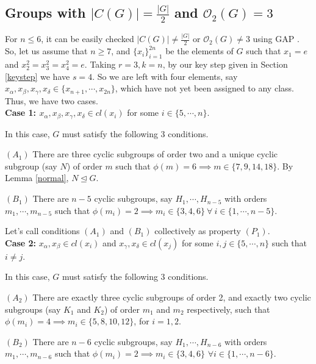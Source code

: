 \documentclass[a4paper,11pt]{amsart}
\numberwithin{equation}{section}
\numberwithin{equation}{subsection}
\begin{document}
\subsection{Groups with \texorpdfstring{$|C(G)|=\frac{|G|}{2}$}{|C(G)|=|G|/2} and \texorpdfstring{$\mathcal{O}_2(G)=3$}{O2(G)=3}} \label{o2(G)=3, |G|/2} 
For $n \leq 6$, it can be easily checked $|C(G)| \neq \frac{|G|}{2}$ or $\mathcal{O}_{2}(G)\neq 3$ using GAP \cite{GAP}. So, let us assume that $n\geq 7$, and $\{x_i\}_{i=1}^{2n}$ be the elements of $G$ such that $x_1 = e$ and $x_2^2=x_{3}^2=x_{4}^2 = e$. 
Taking $r=3, k=n$, by our key step given in Section \ref{keystep} we have $s=4$. So we are left with four elements, say $x_\alpha , x_\beta,x_{\gamma},x_{\delta} \in \{x_{n+1}, \cdots, x_{2n}\}$, which have not yet been assigned to any class. Thus, we have two cases.\\  

 \textbf{Case 1: $x_{\alpha},x_{\beta},x_{\gamma},x_{\delta} \in cl(x_{i})$} for some $i\in\{5,\cdots,n\}$.


 In this case, $G$ must satisfy the following $3$ conditions.

$(A_1)$ There are three cyclic subgroups of order two and a unique cyclic subgroup (say $N$) of order $m$ such that $\phi(m) = 6 \implies m\in \{7,9,14,18\}$. By Lemma \ref{normal}, $N\trianglelefteq G$.

$(B_1)$ There are $n-5$ cyclic subgroups, say $H_1,\cdots,H_{n-5}$ with orders $m_1,\cdots,m_{n-5}$ such that $\phi(m_i) = 2\implies m_i\in \{3,4,6\} ~\forall ~i\in \{1,\cdots,n-5\}$.

 Let's call conditions $(A_1)$ and $(B_1)$ collectively as property $(P_1)$.
\\

\textbf{Case 2:} $x_{\alpha},x_{\beta}\in cl(x_i)$ and $ x_{\gamma},x_{\delta} \in cl(x_{j})$ for some $i,j\in\{5,\cdots,n\}$ such that $i\neq j$.


  In this case, $G$ must satisfy the following $3$ conditions.

$(A_2)$ There are exactly three cyclic subgroups of order 2,
and exactly two cyclic subgroups (say $K_1$ and $K_2$) of order $m_1$ and $m_2$ respectively, 
such that $\phi(m_i) = 4 \implies m_i\in \{5,8,10,12\}$, for $i=1,2$.

$(B_2)$ There are $n-6$ cyclic subgroups, say $H_1,\cdots,H_{n-6}$ with orders $m_1,\cdots,m_{n-6}$ 
such that $\phi(m_i) = 2\implies m_i\in \{3,4,6\} $ $\forall i\in \{1,\cdots,n-6\}$.
\end{document}
